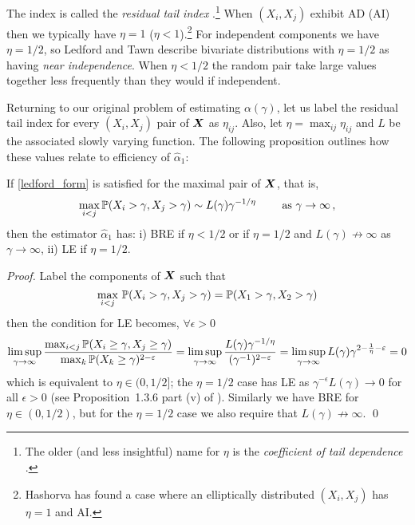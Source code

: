 The index is called the \emph{residual tail index} \cite{de2007extreme,nolde2014geometric}.\footnote{The older (and less insightful) name for $\eta$ is the \emph{coefficient of tail dependence} \cite{ledford1996statistics,resnick2002hidden}.} When $(X_i, X_j)$ exhibit AD (AI) then we typically have $\eta = 1$ ($\eta < 1$).\footnote{Hashorva \cite{hashorva2010residual} has found a case where an elliptically distributed $(X_i, X_j)$ has $\eta = 1$ and AI.} For independent components we have $\eta = 1/2$, so Ledford and Tawn \cite{ledford1996statistics} describe bivariate distributions with $\eta = 1/2$ as having \emph{near independence}. When $\eta < 1/2$ the random pair take large values together less frequently than they would if independent.

Returning to our original problem of estimating $\alpha(\gamma)$, let us label the residual tail index for every $(X_i,X_j)$ pair of $\bm{X}$ as $\eta_{ij}$. Also, let $\eta=\max_{ij}\eta_{ij}$ and $L$ be the associated slowly varying function. The following proposition outlines how these values relate to efficiency of $\hat{\alpha}_1$:

\begin{Proposition}
If \eqref{ledford_form} is satisfied for the maximal pair of $\bm{X}$, that is,
\[ \max_{i < j} \operatorname{{\mathbb P}}(X_i > \gamma, X_j > \gamma) \sim L(\gamma) \gamma^{-1/\eta} \qquad \text{ as } \gamma \to \infty \,, \]
then the estimator $\hat{\alpha}_1$ has: i) BRE if $\eta<1/2$ or if $\eta=1/2$ and $L(\gamma) \not\to \infty$ as $\gamma \to \infty$, ii) LE if $\eta=1/2$.  
\end{Proposition}

\begin{proof}
Label the components of $\bm{X}$ such that
\[ \max_{i < j} \, \operatorname{{\mathbb P}}(X_i > \gamma,X_j > \gamma) = \operatorname{{\mathbb P}}(X_1 > \gamma,X_2 > \gamma) \]
then the condition for LE becomes, $\forall \epsilon > 0$
\[ \limsup_{\gamma \to \infty} \frac{\max_{i < j} \operatorname{{\mathbb P}}(X_i\ge \gamma, X_j\ge \gamma)}{\max_k \operatorname{{\mathbb P}}(X_k\ge \gamma)^{2-\varepsilon}} =
 \limsup_{\gamma \to \infty} \frac{ L(\gamma) \gamma^{-1/\eta} } { (\gamma^{-1})^{2-\varepsilon} } = 
 \limsup_{\gamma \to \infty} L(\gamma) \gamma^{2 - \frac1\eta - \varepsilon} = 0 \]
which is equivalent to $\eta \in (0, 1/2]$; the $\eta=1/2$ case has LE as $\gamma^{-\epsilon} L(\gamma) \to 0$ for all $\epsilon > 0$ (see Proposition~1.3.6 part (v) of \cite{bingham1989regular}). Similarly we have BRE for $\eta \in (0, 1/2)$, but for the $\eta = 1/2$ case we also require that $L(\gamma) \not\to \infty$. \qed
\end{proof}

